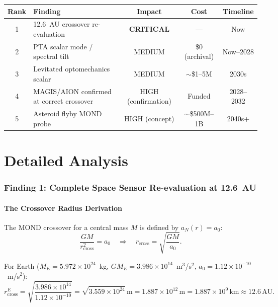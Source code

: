 \documentclass[11pt]{article}
\theoremstyle{definition}
\theoremstyle{remark}
\newcommand{\ee}[1]{\times10^{#1}}
\newcommand{\azero}{a_0}
\begin{document}
\begin{table}[H]
\centering
\small
\begin{tabular}{@{}clccc@{}}
\toprule
Rank & Finding & Impact & Cost & Timeline \\
\midrule
1 & 12.6~AU crossover re-evaluation & \textbf{CRITICAL} & --- & Now \\
2 & PTA scalar mode / spectral tilt & MEDIUM & \$0 (archival) & Now--2028 \\
3 & Levitated optomechanics scalar & MEDIUM & $\sim$\$1--5M & 2030s \\
4 & MAGIS/AION confirmed at correct crossover & HIGH (confirmation) & Funded & 2028--2032 \\
5 & Asteroid flyby MOND probe & HIGH (concept) & $\sim$\$500M--1B & 2040s+ \\
\bottomrule
\end{tabular}
\end{table}

\part{Detailed Analysis}

\section{Finding 1: Complete Space Sensor Re-evaluation at 12.6~AU}
\label{sec:crossover}

\subsection{The Crossover Radius Derivation}

The MOND crossover for a central mass $M$ is defined by $a_N(r) = \azero$:
\begin{equation}
\frac{GM}{r_{\mathrm{cross}}^2} = \azero
\quad\Rightarrow\quad
r_{\mathrm{cross}} = \sqrt{\frac{GM}{\azero}}.
\label{eq:crossover-def}
\end{equation}

For Earth ($M_E = 5.972\ee{24}$~kg, $GM_E = 3.986\ee{14}$~m$^3$/s$^2$,
$\azero = 1.12\ee{-10}$~m/s$^2$):
\begin{equation}
r_{\mathrm{cross}}^E = \sqrt{\frac{3.986\ee{14}}{1.12\ee{-10}}}
= \sqrt{3.559\ee{24}}\,\mathrm{m}
= 1.887\ee{12}\,\mathrm{m}
= 1.887\ee{9}\,\mathrm{km}
\approx 12.6\,\mathrm{AU}.
\label{eq:crossover-earth}
\end{equation}
\end{document}
